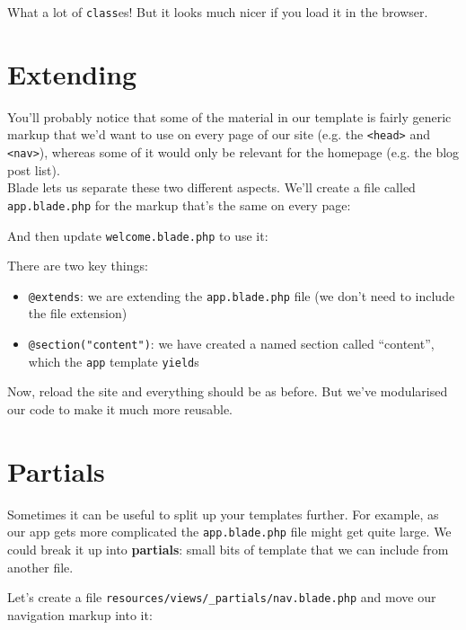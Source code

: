 What a lot of \texttt{class}es! But it looks much nicer if you load it in the browser.



\section{Extending}

You'll probably notice that some of the material in our template is fairly generic markup that we'd want to use on every page of our site (e.g. the \texttt{<head>} and \texttt{<nav>}), whereas some of it would only be relevant for the homepage (e.g. the blog post list).
\\

Blade lets us separate these two different aspects. We'll create a file called \texttt{app.blade.php} for the markup that's the same on every page:


And then update \texttt{welcome.blade.php} to use it:


There are two key things:

\begin{itemize}
    \item \texttt{@extends}: we are extending the \texttt{app.blade.php} file (we don't need to include the file extension)
    \item \texttt{@section("content")}: we have created a named section called ``content'', which the \texttt{app} template \texttt{yield}s
\end{itemize}

Now, reload the site and everything should be as before. But we've modularised our code to make it much more reusable.


\section{Partials}

Sometimes it can be useful to split up your templates further. For example, as our app gets more complicated the \texttt{app.blade.php} file might get quite large. We could break it up into \textbf{partials}: small bits of template that we can include from another file.

\pagebreak

Let's create a file \texttt{resources/views/\_partials/nav.blade.php} and move our navigation markup into it:

